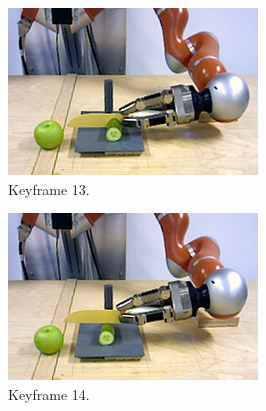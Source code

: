 \begin{figure}\ContinuedFloat
  \centering
  \begin{subfigure}[t]{0.475\textwidth}
    \includegraphics[width=\textwidth]{./figures/sec/planning/exec4/frame5746.jpg}
    \caption{Keyframe 13.}
    \label{fig:sec_usingaffordanceforplanning_results_scenario4_13}
  \end{subfigure}
  \hfill
  \begin{subfigure}[t]{0.475\textwidth}
    \includegraphics[width=\textwidth]{./figures/sec/planning/exec4/frame4450.jpg}
    \caption{Keyframe 14.}
    \label{fig:sec_usingaffordanceforplanning_results_scenario4_14}
  \end{subfigure}\\%
  \begin{subfigure}[t]{0.475\textwidth}

\end{subfigure}
\end{figure}
